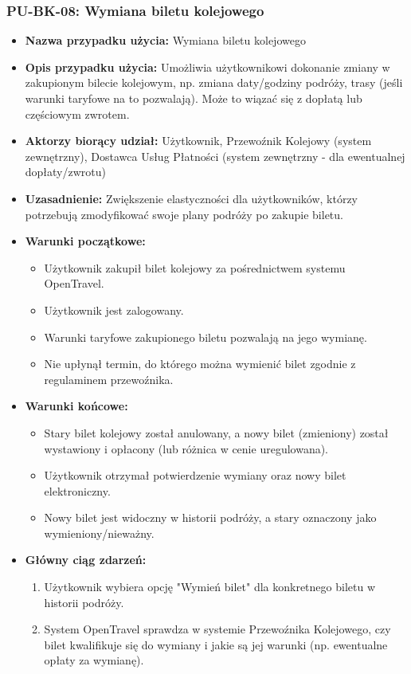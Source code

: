 \documentclass[a4paper,12pt]{article}
\begin{document}
\subsubsection{PU-BK-08: Wymiana biletu kolejowego}
\begin{itemize}
\item \textbf{Nazwa przypadku użycia:} Wymiana biletu kolejowego
\item \textbf{Opis przypadku użycia:} Umożliwia użytkownikowi dokonanie zmiany w zakupionym bilecie kolejowym, np. zmiana daty/godziny podróży, trasy (jeśli warunki taryfowe na to pozwalają). Może to wiązać się z dopłatą lub częściowym zwrotem.
\item \textbf{Aktorzy biorący udział:} Użytkownik, Przewoźnik Kolejowy (system zewnętrzny), Dostawca Usług Płatności (system zewnętrzny - dla ewentualnej dopłaty/zwrotu)
\item \textbf{Uzasadnienie:} Zwiększenie elastyczności dla użytkowników, którzy potrzebują zmodyfikować swoje plany podróży po zakupie biletu.
\item \textbf{Warunki początkowe:}
\begin{itemize}
\item Użytkownik zakupił bilet kolejowy za pośrednictwem systemu OpenTravel.
\item Użytkownik jest zalogowany.
\item Warunki taryfowe zakupionego biletu pozwalają na jego wymianę.
\item Nie upłynął termin, do którego można wymienić bilet zgodnie z regulaminem przewoźnika.
\end{itemize}
\item \textbf{Warunki końcowe:}
\begin{itemize}
\item Stary bilet kolejowy został anulowany, a nowy bilet (zmieniony) został wystawiony i opłacony (lub różnica w cenie uregulowana).
\item Użytkownik otrzymał potwierdzenie wymiany oraz nowy bilet elektroniczny.
\item Nowy bilet jest widoczny w historii podróży, a stary oznaczony jako wymieniony/nieważny.
\end{itemize}
\item \textbf{Główny ciąg zdarzeń:}
\begin{enumerate}
\item Użytkownik wybiera opcję "Wymień bilet" dla konkretnego biletu w historii podróży.
\item System OpenTravel sprawdza w systemie Przewoźnika Kolejowego, czy bilet kwalifikuje się do wymiany i jakie są jej warunki (np. ewentualne opłaty za wymianę).

\end{enumerate}
\end{itemize}
\end{document}
